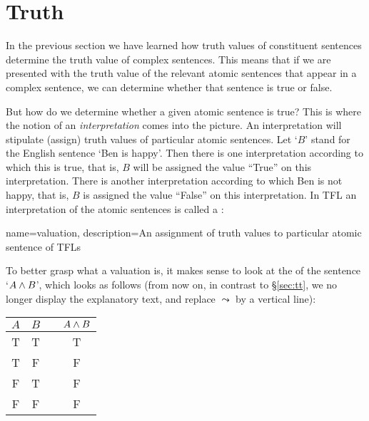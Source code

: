 \section{Truth}
In the previous section we have learned how truth values of constituent sentences determine the truth value of complex sentences. This means that if we are presented with the truth value of the relevant atomic sentences that appear in a complex sentence, we can determine whether that sentence is true or false.

But how do we determine whether a given atomic sentence is true? This is where the notion of an \emph{interpretation} comes into the picture. An interpretation will stipulate (assign) truth values of particular atomic sentences. Let `$B$' stand for the English sentence `Ben is happy'. Then there is one interpretation according to which this is true, that is, $B$ will be assigned the value ``True'' on this interpretation. There is another interpretation according to which Ben is not happy, that is, $B$ is assigned the value ``False'' on this interpretation. In TFL an interpretation of the atomic sentences is called a :


{
name=valuation,
description={An assignment of \glspl{truth value} to particular atomic \glspl{sentence of TFL}}
}

To better grasp what a valuation is, it makes sense to look at the  of the sentence `$A\mathbin{\wedge} B$', which looks as follows 
(from now on, in contrast to \S\ref{sec:tt}, we no longer display the explanatory text, and replace $\leadsto$ by a vertical line):

\begin{center}
\begin{tabular}{ccc|c}
$A$&$B$&&$A\mathbin{\wedge} B$\\\hline
T & T && T\\
T & F && F\\
F & T && F\\
F & F && F
\end{tabular}
\end{center}

